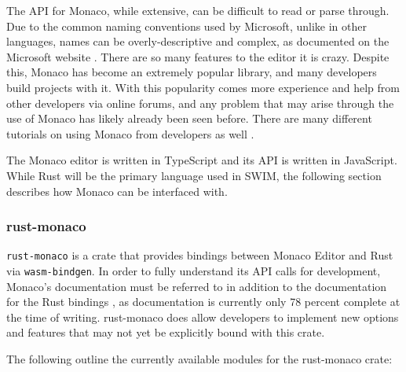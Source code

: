 \documentclass[
    paper=letter,
    parskip=half,
    fontsize=12pt,
    titlepage=firstiscover,
    toc=bibliography,
    numbers=endperiod
]{scrartcl}
\begin{document}
The API for Monaco, while extensive, can be difficult to read or parse
through. Due to the common naming conventions used by Microsoft, unlike
in other languages, names can be overly-descriptive and complex, as
documented on the Microsoft website \cite{monaco-api}. There are so many
features to the editor it is crazy.
Despite this, Monaco has become an extremely popular library, and many
developers build projects with it. With this popularity comes more
experience and help from other developers via online forums, and any
problem that may arise through the use of Monaco has likely already been
seen before. There are many different tutorials on using Monaco from
developers as well \cite{mishka-monaco, sahoo2018}.

The Monaco editor is written in TypeScript and its API is written in
JavaScript. While Rust will be the primary language used in SWIM, the
following section describes how Monaco can be interfaced with.

\subsubsection{rust-monaco}

\texttt{rust-monaco} \cite{rust-monaco} is a crate that provides
bindings between Monaco Editor and Rust via \texttt{wasm-bindgen}. In
order to fully understand its API calls for development, Monaco's
documentation must be referred to in addition to the documentation for
the Rust bindings \cite{rust-monaco-docs}, as documentation is currently
only 78 percent complete at the time of writing. rust-monaco does allow
developers to implement new options and features that may not yet be
explicitly bound with this crate.

The following outline the currently available modules for the
rust-monaco crate:
\end{document}
